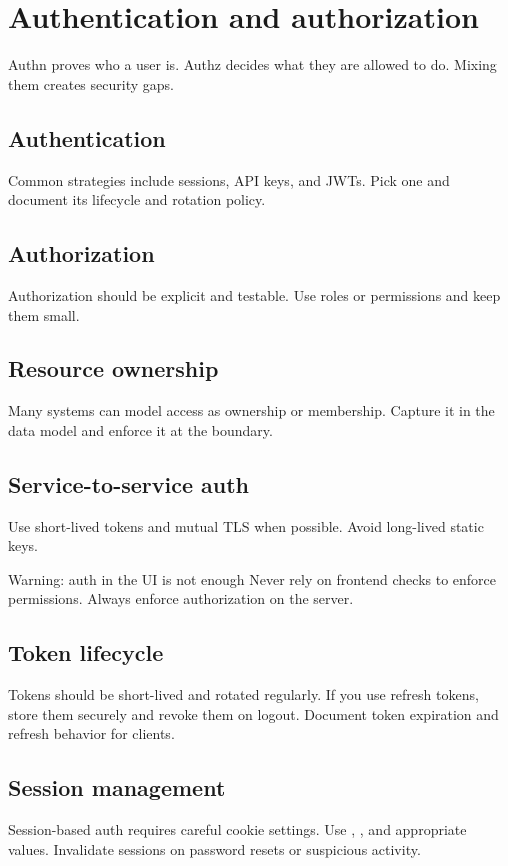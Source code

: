 \chapter{Authentication and authorization}

Authn proves who a user is.
Authz decides what they are allowed to do.
Mixing them creates security gaps.

\section{Authentication}
Common strategies include sessions, API keys, and JWTs.
Pick one and document its lifecycle and rotation policy.

\section{Authorization}
Authorization should be explicit and testable.
Use roles or permissions and keep them small.

\section{Resource ownership}
Many systems can model access as ownership or membership.
Capture it in the data model and enforce it at the boundary.

\section{Service-to-service auth}
Use short-lived tokens and mutual TLS when possible.
Avoid long-lived static keys.

\begin{warningbox}{Warning: auth in the UI is not enough}
Never rely on frontend checks to enforce permissions.
Always enforce authorization on the server.
\end{warningbox}

\section{Token lifecycle}
Tokens should be short-lived and rotated regularly.
If you use refresh tokens, store them securely and revoke them on logout.
Document token expiration and refresh behavior for clients.

\section{Session management}
Session-based auth requires careful cookie settings.
Use , , and appropriate  values.
Invalidate sessions on password resets or suspicious activity.

